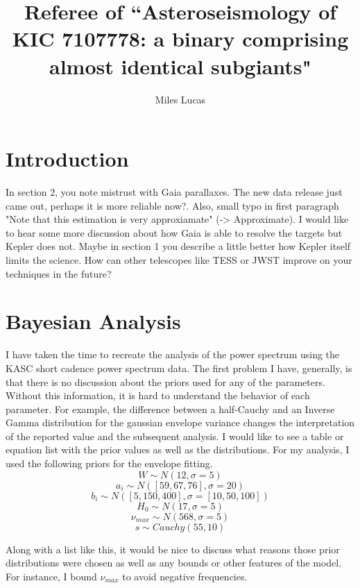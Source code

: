 \documentclass[10pt,a4paper]{article}
\author{Miles Lucas}
\title{Referee of ``Asteroseismology of KIC 7107778: a binary comprising almost identical subgiants"}
\begin{document}
	
		\maketitle
		
		\section{Introduction}
		
		In section 2, you note mistrust with Gaia parallaxes. The new data release just came out, perhaps it is more reliable now?. Also, small typo in first paragraph "Note that this estimation is very approxiamate" (-> Approximate). I would like to hear some more discussion about how Gaia is able to resolve the targets but Kepler does not. Maybe in section 1 you describe a little better how Kepler itself limits the science. How can other telescopes like TESS or JWST improve on your techniques in the future?
		
		\section{Bayesian Analysis}
		
		I have taken the time to recreate the analysis of the power spectrum using the KASC short cadence power spectrum data. The first problem I have, generally, is that there is no discussion about the priors used for any of the parameters. Without this information, it is hard to understand the behavior of each parameter. For example, the difference between a half-Cauchy and an Inverse Gamma distribution for the gaussian envelope variance changes the interpretation of the reported value and the subsequent analysis. I would like to see a table or equation list with the prior values as well as the distributions. For my analysis, I used the following priors for the envelope fitting.
		$$ W \sim N(12, \sigma=5) $$
		$$ a_i \sim N([59, 67, 76], \sigma=20) $$
		$$ b_i \sim N([5, 150, 400], \sigma=[10, 50, 100]) $$
		$$ H_0 \sim N(17, \sigma=5) $$
		$$ \nu_{max} \sim N(568, \sigma=5) $$
		$$ s \sim Cauchy(55, 10) $$
		
		Along with a list like this, it would be nice to discuss what reasons those prior distributions were chosen as well as any bounds or other features of the model. For instance, I bound $\nu_{max}$ to avoid negative frequencies. 
		
\end{document}
